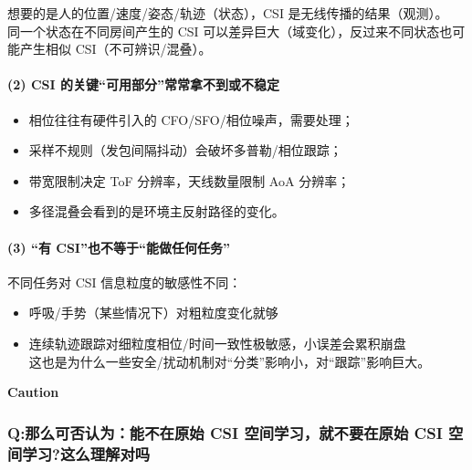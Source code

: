 \documentclass[
]{article}
\begin{document}
想要的是人的位置/速度/姿态/轨迹（状态），CSI
是无线传播的结果（观测）。\\
同一个状态在不同房间产生的 CSI
可以差异巨大（域变化），反过来不同状态也可能产生相似
CSI（不可辨识/混叠）。

\paragraph{(2) CSI
的关键``可用部分''常常拿不到或不稳定}\label{2-csi-ux7684ux5173ux952eux53efux7528ux90e8ux5206ux5e38ux5e38ux62ffux4e0dux5230ux6216ux4e0dux7a33ux5b9a}

\begin{itemize}
\item
  相位往往有硬件引入的 CFO/SFO/相位噪声，需要处理；
\item
  采样不规则（发包间隔抖动）会破坏多普勒/相位跟踪；
\item
  带宽限制决定 ToF 分辨率，天线数量限制 AoA 分辨率；
\item
  多径混叠会看到的是环境主反射路径的变化。
\end{itemize}

\paragraph{(3) ``有
CSI''也不等于``能做任何任务''}\label{3-ux6709-csiux4e5fux4e0dux7b49ux4e8eux80fdux505aux4efbux4f55ux4efbux52a1}

不同任务对 CSI 信息粒度的敏感性不同：

\begin{itemize}
\item
  呼吸/手势（某些情况下）对粗粒度变化就够
\item
  连续轨迹跟踪对细粒度相位/时间一致性极敏感，小误差会累积崩盘\\
  这也是为什么一些安全/扰动机制对``分类''影响小，对``跟踪''影响巨大。
\end{itemize}

\textbf{Caution}\\

\subsubsection{Q:那么可否认为：能不在原始 CSI 空间学习，就不要在原始 CSI
空间学习?这么理解对吗}\label{qux90a3ux4e48ux53efux5426ux8ba4ux4e3aux80fdux4e0dux5728ux539fux59cb-csi-ux7a7aux95f4ux5b66ux4e60ux5c31ux4e0dux8981ux5728ux539fux59cb-csi-ux7a7aux95f4ux5b66ux4e60ux8fd9ux4e48ux7406ux89e3ux5bf9ux5417}
\end{document}
